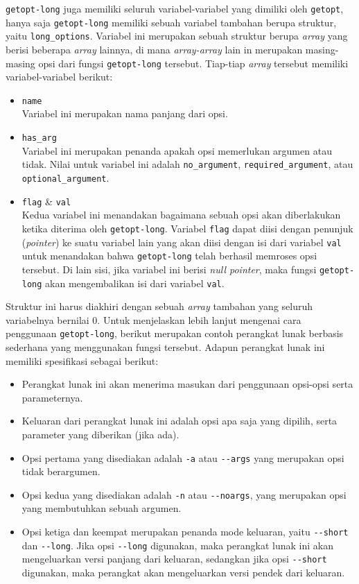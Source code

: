 \verb|getopt-long| juga memiliki seluruh variabel-variabel yang dimiliki oleh \verb|getopt|, hanya saja \verb|getopt-long| memiliki sebuah variabel tambahan berupa struktur, yaitu \verb|long_options|. Variabel ini merupakan sebuah struktur berupa \textit{array} yang berisi beberapa \textit{array} lainnya, di mana \textit{array-array} lain in merupakan masing-masing opsi dari fungsi \verb|getopt-long| tersebut. Tiap-tiap \textit{array} tersebut memiliki variabel-variabel berikut:

\begin{itemize}
	\item \verb|name|\\
	Variabel ini merupakan nama panjang dari opsi.
	\item \verb|has_arg|\\
	Variabel ini merupakan penanda apakah opsi memerlukan argumen atau tidak. Nilai untuk variabel ini adalah \verb|no_argument|, \verb|required_argument|, atau \verb|optional_argument|.
	\item \verb|flag| \& \verb|val|\\ 
	Kedua variabel ini menandakan bagaimana sebuah opsi akan diberlakukan ketika diterima oleh \verb|getopt-long|. Variabel \verb|flag| dapat diisi dengan penunjuk (\textit{pointer}) ke suatu variabel lain yang akan diisi dengan isi dari variabel \verb|val| untuk menandakan bahwa \verb|getopt-long| telah berhasil memroses opsi tersebut. Di lain sisi, jika variabel ini berisi \textit{null pointer}, maka fungsi \verb|getopt-long| akan mengembalikan isi dari variabel \verb|val|.
\end{itemize}
\noindent
Struktur ini harus diakhiri dengan sebuah \textit{array} tambahan yang seluruh variabelnya bernilai 0.
\newline\newline
Untuk menjelaskan lebih lanjut mengenai cara penggunaan \verb|getopt-long|, berikut merupakan contoh perangkat lunak berbasis \cl sederhana yang menggunakan fungsi tersebut. Adapun perangkat lunak ini memiliki spesifikasi sebagai berikut:

\begin{itemize}
	\item Perangkat lunak ini akan menerima masukan dari penggunaan opsi-opsi serta parameternya.
	\item Keluaran dari perangkat lunak ini adalah opsi apa saja yang dipilih, serta parameter yang diberikan (jika ada).
	\item Opsi pertama yang disediakan adalah \verb|-a| atau \verb|--args| yang merupakan opsi tidak berargumen.
	\item Opsi kedua yang disediakan adalah \verb|-n| atau \verb|--noargs|, yang merupakan opsi yang membutuhkan sebuah argumen.
	\item Opsi ketiga dan keempat merupakan penanda mode keluaran, yaitu \verb|--short| dan \verb|--long|. Jika opsi \verb|--long| digunakan, maka perangkat lunak ini akan mengeluarkan versi panjang dari keluaran, sedangkan jika opsi \verb|--short| digunakan, maka perangkat akan mengeluarkan versi pendek dari keluaran.
\end{itemize}

